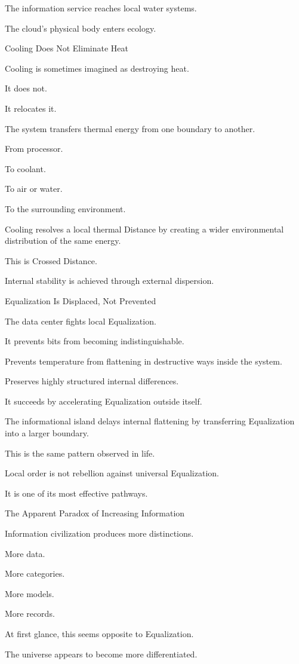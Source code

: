 The information service reaches local water systems.

The cloud’s physical body enters ecology.

Cooling Does Not Eliminate Heat

Cooling is sometimes imagined as destroying heat.

It does not.

It relocates it.

The system transfers thermal energy from one boundary to another.

From processor.

To coolant.

To air or water.

To the surrounding environment.

Cooling resolves a local thermal Distance by creating a wider environmental distribution of the same energy.

This is Crossed Distance.

Internal stability is achieved through external dispersion.

Equalization Is Displaced, Not Prevented

The data center fights local Equalization.

It prevents bits from becoming indistinguishable.

Prevents temperature from flattening in destructive ways inside the system.

Preserves highly structured internal differences.

It succeeds by accelerating Equalization outside itself.

The informational island delays internal flattening by transferring Equalization into a larger boundary.

This is the same pattern observed in life.

Local order is not rebellion against universal Equalization.

It is one of its most effective pathways.

The Apparent Paradox of Increasing Information

Information civilization produces more distinctions.

More data.

More categories.

More models.

More records.

At first glance, this seems opposite to Equalization.

The universe appears to become more differentiated.

